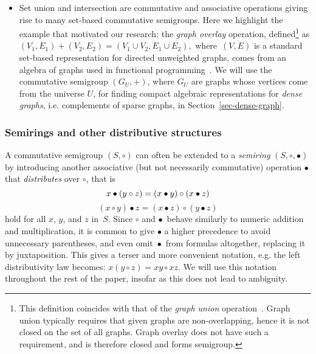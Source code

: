 \documentclass[11pt,letterpaper]{article}
\begin{document}
\begin{itemize}
  \item Set union and intersection are commutative and associative operations
  giving rise to many set-based commutative semigroups. Here we highlight the
  example 
  {}  
  that motivated our research: the \emph{graph overlay} operation,
  defined\footnote{This definition coincides with that of the
  \emph{graph union} operation~\cite{1969_graph_theory_harary}. Graph union
  typically requires that given graphs are non-overlapping, hence it is not
  closed on the set of all graphs. Graph overlay does not have such a
  requirement, and is therefore closed and forms semigroup.} as
  $(V_1, E_1) + (V_2, E_2) = (V_1 \cup V_2, E_1 \cup E_2)$,~where~$(V, E)$ is
  a standard set-based representation for directed unweighted graphs, comes from
  an algebra of graphs used in functional programming~\cite{mokhov2017algebraic}.
  We will use the commutative semigroup $(G_U,+)$, where $G_U$ are graphs whose
  vertices come from the universe $U$, for finding compact algebraic
  representations for \emph{dense graphs}, i.e. complements of sparse graphs,
  in Section~\ref{sec-dense-graph}.
\end{itemize}

\subsubsection{Semirings and other distributive structures}

A commutative semigroup $(S, \circ)$ can often be extended to a \emph{semiring}
$(S, \circ, \bullet)$ by introducing another associative (but not necessarily
commutative) operation $\bullet$ that \emph{distributes} over $\circ$, that is
\[
x \bullet (y \circ z) = (x \bullet y) \circ (x \bullet z)\\
\]
\[
(x \circ y) \bullet z = (x \bullet z) \circ (y \bullet z)
\]
hold for all $x$, $y$, and $z$ in~$S$. Since $\circ$ and $\bullet$~behave
similarly to numeric addition and multiplication, it is common to give $\bullet$
a higher precedence to avoid unnecessary parentheses, and even omit~$\bullet$~from
formulas altogether, replacing it by juxtaposition. This gives a terser and
more convenient notation, e.g. the left distributivity law becomes:
$x (y \circ z) = x y \circ x z$. We will use this notation throughout the rest
of the paper, insofar as this does not lead to ambiguity.

\end{document}
